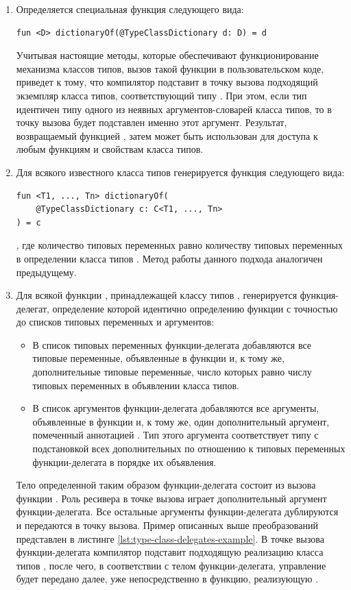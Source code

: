 \begin{enumerate}
    \item Определяется специальная функция следующего вида: 
    \begin{lstlisting}[style={wo_caption}]
fun <D> dictionaryOf(@TypeClassDictionary d: D) = d
    \end{lstlisting}
    Учитывая настоящие методы, которые обеспечивают функционирование механизма классов типов, вызов такой функции в пользовательском коде, приведет к тому, что компилятор подставит в точку вызова подходящий экземпляр класса типов, соответствующий типу . При этом, если тип  идентичен типу одного из неявных аргументов-словарей класса типов, то в точку вызова будет подставлен именно этот аргумент. Результат, возвращаемый функцией , затем может быть использован для доступа к любым функциям и свойствам класса типов.  
    \item Для всякого известного класса типов  генерируется функция следующего вида:
    \begin{lstlisting}[style={wo_caption}]
fun <T1, ..., Tn> dictionaryOf(
    @TypeClassDictionary c: C<T1, ..., Tn>
) = c
    \end{lstlisting}
    , где количество типовых переменных равно количеству типовых переменных в определении класса типов . Метод работы данного подхода аналогичен предыдущему. 
    \item Для всякой функции , принадлежащей классу типов , генерируется функция-делегат, определение которой идентично определению функции  с точностью до списков типовых переменных и аргументов:
    \begin{itemize}
        \item В список типовых переменных функции-делегата добавляются все типовые переменные, объявленные в функции  и, к тому же, дополнительные типовые переменные, число которых равно числу типовых переменных в объявлении класса типов.
        \item В список аргументов функции-делегата добавляются все аргументы, объявленные в функции  и, к тому же, один дополнительный аргумент, помеченный аннотацией . Тип этого аргумента соответствует типу  с подстановкой всех дополнительных по отношению к  типовых переменных функции-делегата в порядке их объявления.   
    \end{itemize}
    Тело определенной таким образом функции-делегата  состоит из вызова функции . Роль ресивера в точке вызова играет дополнительный аргумент функции-делегата. Все остальные аргументы функции-делегата дублируются и передаются в точку вызова. Пример описанных выше преобразований представлен в листинге \ref{lst:type-class-delegates-example}. В точке вызова функции-делегата компилятор подставит подходящую реализацию класса типов , после чего, в соответствии с телом функции-делегата, управление будет передано далее, уже непосредственно в функцию, реализующую . 
\end{enumerate}

